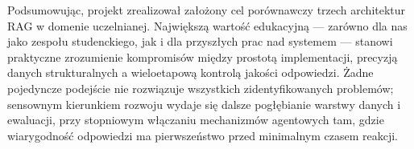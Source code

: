 \vspace{1em}

\noindent
Podsumowując, projekt zrealizował założony cel porównawczy trzech architektur RAG w domenie uczelnianej.
Największą wartość edukacyjną --- zarówno dla nas jako zespołu studenckiego, jak i dla przyszłych prac
nad systemem --- stanowi praktyczne zrozumienie kompromisów między prostotą implementacji, precyzją
danych strukturalnych a wieloetapową kontrolą jakości odpowiedzi. Żadne pojedyncze podejście nie rozwiązuje
wszystkich zidentyfikowanych problemów; sensownym kierunkiem rozwoju wydaje się dalsze pogłębianie warstwy
danych i ewaluacji, przy stopniowym włączaniu mechanizmów agentowych tam, gdzie wiarygodność odpowiedzi
ma pierwszeństwo przed minimalnym czasem reakcji.

\vspace{1em}

\newpage
